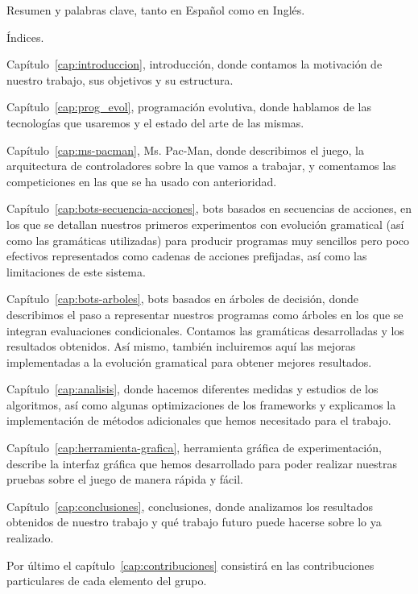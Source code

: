 Resumen y palabras clave, tanto en Español como en Inglés.

Índices.

Capítulo~\ref{cap:introduccion}, introducción, donde contamos la motivación de nuestro trabajo, sus objetivos y su estructura.

Capítulo~\ref{cap:prog_evol}, programación evolutiva, donde hablamos de las tecnologías que usaremos y el estado del arte de las mismas.

Capítulo~\ref{cap:ms-pacman}, Ms. Pac-Man, donde describimos el juego, la arquitectura de controladores sobre la que vamos a trabajar, y comentamos las competiciones en las que se ha usado con anterioridad.

Capítulo~\ref{cap:bots-secuencia-acciones}, bots basados en secuencias de acciones, en los que se detallan nuestros primeros experimentos con evolución gramatical (así como las gramáticas utilizadas) para producir programas muy sencillos pero poco efectivos representados como cadenas de acciones prefijadas, así como las limitaciones de este sistema.

Capítulo~\ref{cap:bots-arboles}, bots basados en árboles de decisión, donde describimos el paso a representar nuestros programas como árboles en los que se integran evaluaciones condicionales. Contamos las gramáticas desarrolladas y los resultados obtenidos. Así mismo, también incluiremos aquí las mejoras implementadas a la evolución gramatical para obtener mejores resultados.

Capítulo~\ref{cap:analisis}, donde hacemos diferentes medidas y estudios de los algoritmos, así como algunas optimizaciones de los frameworks y explicamos la implementación de métodos adicionales que hemos necesitado para el trabajo.

Capítulo~\ref{cap:herramienta-grafica}, herramienta gráfica de experimentación, describe la interfaz gráfica que hemos desarrollado para poder realizar nuestras pruebas sobre el juego de manera rápida y fácil.

Capítulo~\ref{cap:conclusiones}, conclusiones, donde analizamos los resultados obtenidos de nuestro trabajo y qué trabajo futuro puede hacerse sobre lo ya realizado.

Por último el capítulo~\ref{cap:contribuciones} consistirá en las contribuciones particulares de cada elemento del grupo.
